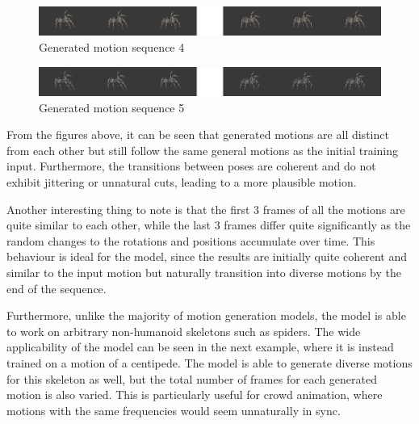 \documentclass[a4paper, 12pt]{report}
\begin{document}
\begin{figure}[H]
	\centering
	\includegraphics[width=\textwidth]{GeneratedMotions/image_reel_initial.png}
	\caption{Generated motion sequence 4}
	\label{image_03}
\end{figure}

\begin{figure}[H]
	\centering
	\includegraphics[width=\textwidth]{GeneratedMotions/image_reel_04.png}
	\caption{Generated motion sequence 5}
	\label{image_04}
\end{figure}

From the figures above, it can be seen that generated motions are all distinct from each other but still follow the same general motions as the initial training input. Furthermore, the transitions between poses are coherent and do not exhibit jittering or unnatural cuts, leading to a more plausible motion. 

Another interesting thing to note is that the first 3 frames of all the motions are quite similar to each other, while the last 3 frames differ quite significantly as the random changes to the rotations and positions accumulate over time. This behaviour is ideal for the model, since the results are initially quite coherent and similar to the input motion but naturally transition into diverse motions by the end of the sequence. 

Furthermore, unlike the majority of motion generation models, the model is able to work on arbitrary non-humanoid skeletons such as spiders. The wide applicability of the model can be seen in the next example, where it is instead trained on a motion of a centipede. The model is able to generate diverse motions for this skeleton as well, but the total number of frames for each generated motion is also varied. This is particularly useful for crowd animation, where motions with the same frequencies would seem unnaturally in sync. 
\end{document}
